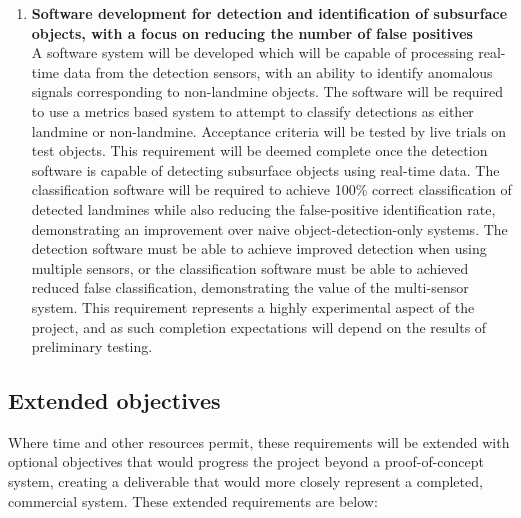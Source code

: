 \documentclass[main.tex]{subfiles}
\begin{document}
\begin{enumerate}
\item \textbf{Software development for detection and identification of subsurface objects, with a focus on reducing the number of false positives}\\ 
A software system will be developed which will be capable of processing real-time data from the detection sensors, with an ability to identify anomalous signals corresponding to non-landmine objects. 
The software will be required to use a metrics based system to attempt to classify detections as either landmine or non-landmine. 
Acceptance criteria will be tested by live trials on test objects. 
This requirement will be deemed complete once the detection software is capable of detecting subsurface objects using real-time data. 
The classification software will be required to achieve 100\% correct classification of detected landmines while also reducing the false-positive identification rate, demonstrating an improvement over naive object-detection-only systems. 
The detection software must be able to achieve improved detection when using multiple sensors, or the classification software must be able to achieved reduced false classification, demonstrating the value of the multi-sensor system. 
This requirement represents a highly experimental aspect of the project, and as such completion expectations will depend on the results of preliminary testing. 
\end{enumerate}

\subsection{Extended objectives}
Where time and other resources permit, these requirements will be extended with optional objectives that would progress the project beyond a proof-of-concept system, creating a deliverable that would more closely represent a completed, commercial system. 
These extended requirements are below:
\end{document}
